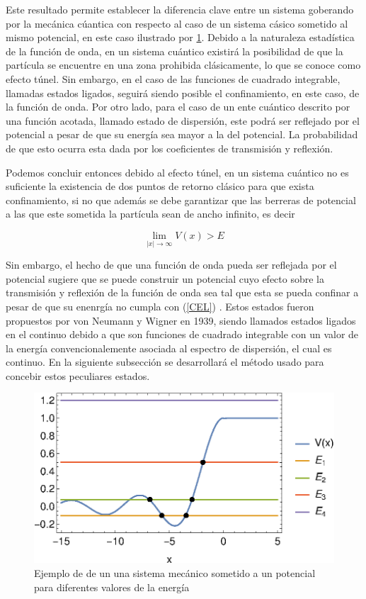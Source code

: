 Este resultado permite establecer la diferencia clave entre un sistema goberando por la mecánica cúantica con respecto al caso de un sistema cásico sometido al mismo potencial, en este caso ilustrado por \ref{Ex-Pot-Figure}. Debido a la naturaleza estadística de la función de onda, en un sistema cuántico existirá la posibilidad de que la partícula se encuentre en una zona prohibida clásicamente, lo que se conoce como efecto túnel. Sin embargo, en el caso de las funciones de cuadrado integrable, llamadas estados ligados, seguirá siendo posible el confinamiento, en este caso, de la función de onda. Por otro lado, para el caso de un ente cuántico descrito por una función acotada, llamado estado de dispersión, este podrá ser reflejado por el potencial a pesar de que su energía sea mayor a la del potencial. La probabilidad de que esto ocurra esta dada por los coeficientes de transmisión y reflexión.  

Podemos concluir entonces  debido al efecto túnel, en un sistema cuántico no es suficiente la existencia de dos puntos de retorno clásico para que exista confinamiento, si no que además se debe garantizar que las berreras de potencial a las que este sometida la partícula sean de ancho infinito, es decir

\begin{equation*}
	\lim_{|x|\to \infty} V(x) > E \label{CEL}
\end{equation*}

Sin embargo, el hecho de que una función de onda pueda ser reflejada por el potencial sugiere que se puede construir un potencial cuyo efecto sobre la transmisión y reflexión de la función de onda sea tal que esta se pueda confinar a pesar de que su enenrgía no cumpla con (\ref{CEL}) . Estos estados fueron propuestos por von Neumann y Wigner en 1939, siendo llamados estados ligados en el continuo debido a que son funciones de cuadrado integrable con un valor de la energía convencionalemente asociada al espectro de dispersión, el cual es continuo. En la siguiente subsección se desarrollará el método usado para concebir estos peculiares estados.


\begin{figure}
	\begin{center}
		\includegraphics{Ex-Pot.eps}%
	\end{center}	
	\caption{\label{Ex-Pot-Figure} Ejemplo de de un una sistema mecánico sometido a un potencial para diferentes valores de la energía 
	}
\end{figure}


